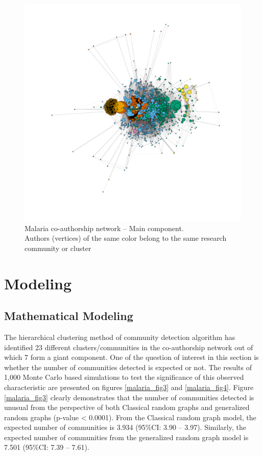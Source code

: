 \begin{figure}[!ht]
\centering
\hspace*{-1cm}
\includegraphics[scale=0.5]{Chapters/malaria/mnet}
\caption{Malaria co-authorship network -- Main component. \\Authors (vertices) of the same color belong to the same research community or cluster}
\label{malaria_fig5}
\end{figure}
\pagebreak
\section{Modeling}
\subsection{Mathematical Modeling}
The hierarchical clustering method of community detection algorithm has identified 23 different clusters/communities in the co-authorship network out of which 7 form a giant component. One of the question of interest in this section is whether the number of communities detected is expected or not. The results of 1,000 Monte Carlo based simulations to test the significance of this observed characteristic are presented on figures \ref{malaria_fig3} and \ref{malaria_fig4}. Figure \ref{malaria_fig3} clearly demonstrates that the number of communities detected is unusual from the perspective of both Classical random graphs and generalized random graphs (p-value < 0.0001). From the Classical random graph model, the expected number of communities is 3.934 (95\%CI: 3.90 -- 3.97). Similarly, the expected number of communities from the generalized random graph model is 7.501 (95\%CI: 7.39 -- 7.61).

